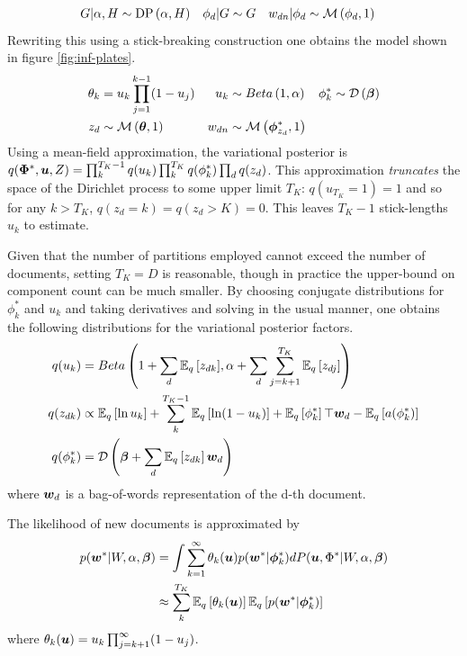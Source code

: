 \begin{align}
G|\alpha, H & \sim \DP{\alpha, H} &
\phi_d|G & \sim G &
w_{dn}|\phi_d & \sim \muln{\phi_d}{1}
\end{align}
Rewriting this using a stick-breaking construction one obtains the model shown in figure \ref{fig:inf-plates}.
\begin{align}
\theta_k & = u_k \prod_{j=1}^{k-1} (1-u_j) &
u_k & \sim \betadist{1}{\alpha} &
\phi^*_k & \sim \dir{\vv{\beta}} \\ 
z_d & \sim \muln{\vv{\theta}}{1} &
w_{dn} & \sim \muln{\vv{\phi^*_{z_d}}}{1}
\end{align}
Using a mean-field approximation, the variational posterior is $q(\vv{\Phi^*}, \vv{u}, Z) = \prod_k^{T_K - 1} q(u_k) \prod_k^{T_K}q(\phi^*_k) \prod_d q(z_d)$. This approximation \emph{truncates} the space of the Dirichlet process to some upper limit $T_K$: $q(u_{T_K} = 1) = 1$ and so for any $k > T_K$, $q(z_d = k) = q(z_d > K) = 0$. This leaves $T_K -1$ stick-lengths $u_k$ to estimate.

Given that the number of partitions employed cannot exceed the number of documents, setting $T_K = D$ is reasonable, though in practice the upper-bound on component count can be much smaller. By choosing conjugate distributions for $\phi^*_k$ and $u_k$ and taking derivatives and solving in the usual manner, one obtains the following distributions for the variational posterior factors\cite{Blei2006b}.
\begin{align}
q(u_k) & =
    \betadist{
        1 + \sum_d \ex{z_{dk}}{q}
       }{
           \alpha + \sum_d \sum_{j={k+1}}^{T_K} \ex{z_{dj}}{q}
       } \label{eqn:ch1:inf-mom-var-algor-first}\\
q(z_{dk}) & \propto 
    \ex{\ln u_k}{q} 
    + \sum_{k}^{T_K-1}
        \ex{\ln (1 - u_k)}{q}
        + \ex{\phi^*_k}{q}\top \wdoc
        - \ex{a(\phi^*_k)}{q} \\
q(\phi^*_k) & =
    \dir{
        \vv{\beta} + \sum_d \ex{z_{dk}}{q} \wdoc
    } \label{eqn:ch1:inf-mom-var-algor-first-last}
\end{align}
where $\vv{w}_d$ is a bag-of-words representation of the d-th document.

The likelihood of new documents is approximated by
\begin{align}
p(\vv{w}^* | W, \alpha, \vv{\beta})
    &= \int
        \sum_{k=1}^\infty \theta_k(\vv{u}) p(\vv{w}^* | \vv{\phi}^*_k)
        dP(\vv{u}, \Phi^* | W, \alpha, \vv{\beta}) \\
    &\approx \sum_k^{T_K} \ex{\theta_k(\vv{u})}{q} \ex{p(\vv{w}^* | \vv{\phi}^*_k)}{q}
\end{align}
where $\theta_k(\vv{u}) = u_k \prod_{j=k+1}^\infty (1 - u_j)$.


